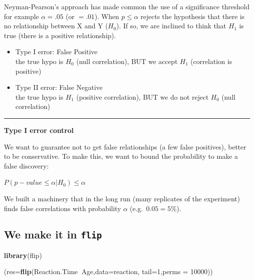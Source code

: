 \documentclass[]{article}
\newenvironment{Shaded}{\begin{snugshade}}{\end{snugshade}}
\newcommand{\DataTypeTok}[1]{\textcolor[rgb]{0.13,0.29,0.53}{#1}}
\newcommand{\DecValTok}[1]{\textcolor[rgb]{0.00,0.00,0.81}{#1}}
\newcommand{\KeywordTok}[1]{\textcolor[rgb]{0.13,0.29,0.53}{\textbf{#1}}}
\newcommand{\NormalTok}[1]{#1}
\newcommand{\OperatorTok}[1]{\textcolor[rgb]{0.81,0.36,0.00}{\textbf{#1}}}
\providecommand{\tightlist}{%
  \setlength{\itemsep}{0pt}\setlength{\parskip}{0pt}}
\begin{document}
Neyman-Pearson's approach has made common the use of a significance
threshold for example \(\alpha=.05\) (or \(=. 01\)). When
\(p \leq \alpha\) rejects the hypothesis that there is no relationship
between X and Y (\(H_0\)). If so, we are inclined to think that \(H_1\)
is true (there is a positive relationship).

\begin{itemize}
\tightlist
\item
  Type I error: False Positive\\
  the true hypo is \(H_0\) (null correlation), BUT we accept \(H_1\)
  (correlation is positive)
\item
  Type II error: False Negative\\
  the true hypo is \(H_1\) (positive correlation), BUT we do not reject
  \(H_0\) (null correlation)
\end{itemize}

\begin{center}\rule{0.5\linewidth}{\linethickness}\end{center}

\textbf{Type I error control}

We want to guarantee not to get false relationships (a few false
positives), better to be conservative. To make this, we want to bound
the probability to make a false discovery:

\(P (p-value \leq \alpha | H_0) \leq \alpha\)

We built a machinery that in the long run (many replicates of the
experiment) finds false correlations with probability \(\alpha\)
(e.g.~\(0.05=5\%\)).

\hypertarget{we-make-it-in-flip}{%
\subsection{\texorpdfstring{We make it in
\texttt{flip}}{We make it in flip}}\label{we-make-it-in-flip}}

\begin{Shaded}
\begin{Highlighting}[]
\KeywordTok{library}\NormalTok{(flip)}

\NormalTok{(}\DataTypeTok{res=}\KeywordTok{flip}\NormalTok{(Reaction.Time}\OperatorTok{~}\NormalTok{Age,}\DataTypeTok{data=}\NormalTok{reaction,}
          \DataTypeTok{tail=}\DecValTok{1}\NormalTok{,}\DataTypeTok{perms =} \DecValTok{10000}\NormalTok{))}
\end{Highlighting}
\end{Shaded}
\end{document}

